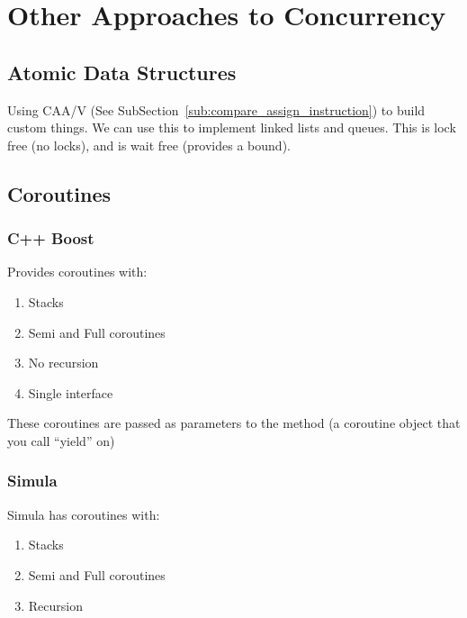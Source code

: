     \chapter{Other Approaches to Concurrency} %
    \label{cha:other_approaches_to_concurrency}
        \section{Atomic Data Structures} %
        \label{sec:atomic_data_structures}
            Using CAA/V (See SubSection~\ref{sub:compare_assign_instruction}) to build custom things.
            We can use this to implement linked lists and queues.
            This is lock free (no locks), and is wait free (provides a bound).
        \section{Coroutines} %
        \label{sec:coroutines}
            \subsection{C++ Boost} %
            \label{sub:boost}
                Provides coroutines with:
                \begin{enumerate}
                    \item Stacks
                    \item Semi and Full coroutines
                    \item No recursion
                    \item Single interface
                \end{enumerate}
                These coroutines are passed as parameters to the method (a coroutine object that you call ``yield'' on)
            \subsection{Simula} %
            \label{sub:simula}
                Simula has coroutines with:
                \begin{enumerate}
                    \item Stacks
                    \item Semi and Full coroutines
                    \item Recursion
                \end{enumerate}
